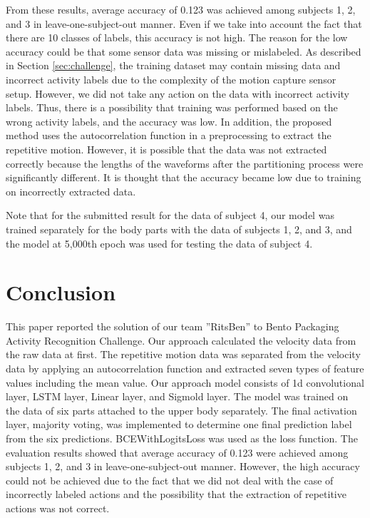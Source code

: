 \documentclass[graybox]{svmult}
\begin{document}
From these results, average accuracy of 0.123 was achieved among subjects 1, 2, and 3 in leave-one-subject-out manner. Even if we take into account the fact that there are 10 classes of labels, this accuracy is not high. The reason for the low accuracy could be that some sensor data was missing or mislabeled. As described in Section \ref{sec:challenge}, the training dataset may contain missing data and incorrect activity labels due to the complexity of the motion capture sensor setup. However, we did not take any action on the data with incorrect activity labels. Thus, there is a possibility that training was performed based on the wrong activity labels, and the accuracy was low. In addition, the proposed method uses the autocorrelation function in a preprocessing to extract the repetitive motion. However, it is possible that the data was not extracted correctly because the lengths of the waveforms after the partitioning process were significantly different. It is thought that the accuracy became low due to training on incorrectly extracted data.\par

Note that for the submitted result for the data of subject 4, our model was trained separately for the body parts with the data of subjects 1, 2, and 3, and the model at 5,000th epoch was used for testing the data of subject 4.


\section{Conclusion}
\label{sec:conclusion}
This paper reported the solution of our team ''RitsBen'' to Bento Packaging Activity Recognition Challenge. Our approach calculated the velocity data from the raw data at first. The repetitive motion data was separated from the velocity data by applying an autocorrelation function and extracted seven types of feature values including the mean value. Our approach model consists of 1d convolutional layer, LSTM layer, Linear layer, and Sigmold layer. The model was trained on the data of six parts attached to the upper body separately. The final activation layer, majority voting, was implemented to determine one final prediction label from the six predictions. BCEWithLogitsLoss was used as the loss function. The evaluation results showed that average accuracy of 0.123 were achieved among subjects 1, 2, and 3 in leave-one-subject-out manner. However, the high accuracy could not be achieved due to the fact that we did not deal with the case of incorrectly labeled actions and the possibility that the extraction of repetitive actions was not correct.
\end{document}
